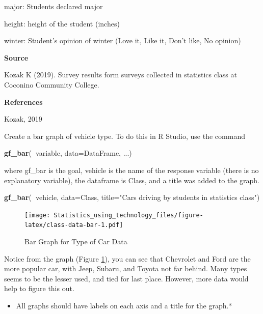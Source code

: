\documentclass[
]{book}
\newenvironment{Shaded}{\begin{snugshade}}{\end{snugshade}}
\newcommand{\DataTypeTok}[1]{\textcolor[rgb]{0.13,0.29,0.53}{#1}}
\newcommand{\KeywordTok}[1]{\textcolor[rgb]{0.13,0.29,0.53}{\textbf{#1}}}
\newcommand{\NormalTok}[1]{#1}
\newcommand{\OperatorTok}[1]{\textcolor[rgb]{0.81,0.36,0.00}{\textbf{#1}}}
\newcommand{\StringTok}[1]{\textcolor[rgb]{0.31,0.60,0.02}{#1}}
\providecommand{\tightlist}{%
  \setlength{\itemsep}{0pt}\setlength{\parskip}{0pt}}
\begin{document}
major: Students declared major

height: height of the student (inches)

winter: Student's opinion of winter (Love it, Like it, Don't like, No opinion)

\textbf{Source}

Kozak K (2019). Survey results form surveys collected in statistics class at Coconino Community College.

\textbf{References}

Kozak, 2019

Create a bar graph of vehicle type. To do this in R Studio, use the command

\begin{Shaded}
\begin{Highlighting}[]
\KeywordTok{gf_bar}\NormalTok{(}\OperatorTok{~}\NormalTok{variable, }\DataTypeTok{data=}\NormalTok{DataFrame, ...)}
\end{Highlighting}
\end{Shaded}

where gf\_bar is the goal, vehicle is the name of the response variable (there is no explanatory variable), the dataframe is Class, and a title was added to the graph.



\begin{Shaded}
\begin{Highlighting}[]
\KeywordTok{gf_bar}\NormalTok{(}\OperatorTok{~}\NormalTok{vehicle, }\DataTypeTok{data=}\NormalTok{Class, }\DataTypeTok{title=}\StringTok{"Cars driving by students in statistics class"}\NormalTok{)}
\end{Highlighting}
\end{Shaded}

\begin{figure}
\centering
\texttt{[image: Statistics\_using\_technology\_files/figure-latex/class-data-bar-1.pdf]}
\caption{\label{fig:class-data-bar}Bar Graph for Type of Car Data}
\end{figure}

Notice from the graph (Figure \ref{fig:class-data-bar}), you can see that Chevrolet and Ford are the more popular car, with Jeep, Subaru, and Toyota not far behind. Many types seems to be the lesser used, and tied for last place. However, more data would help to figure this out.

\begin{itemize}
\tightlist
\item
  All graphs should have labels on each axis and a title for the graph.*
\end{itemize}
\end{document}

